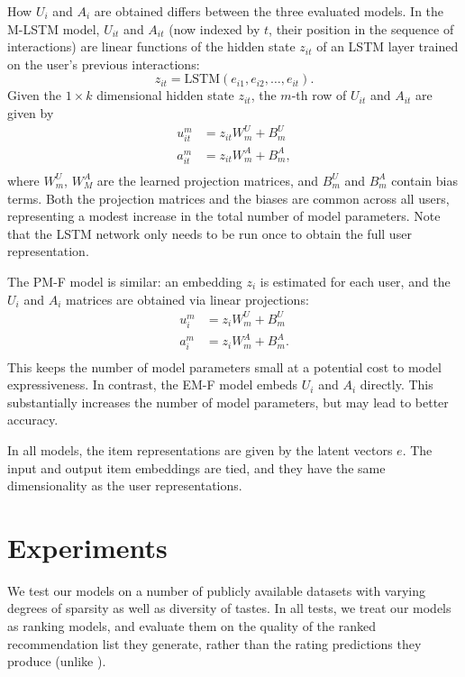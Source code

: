 \documentclass[sigconf]{acmart}
\begin{document}
How $U_i$ and $A_i$ are obtained differs between the three evaluated models. In the M-LSTM model, $U_{it}$ and $A_{it}$ (now indexed by $t$, their position in the sequence of interactions) are linear functions of the hidden state $z_{it}$ of an LSTM layer trained on the user's previous interactions:
\begin{equation}
  \label{eq:lstm}
  z_{it} = \mathrm{LSTM}\left(e_{i1}, e_{i2}, \ldots, e_{it}\right).
\end{equation}
Given the $1 \times k$ dimensional hidden state $z_{it}$, the $m$-th row of $U_{it}$ and $A_{it}$ are given by
\begin{equation}
\begin{aligned}
  u^m_{it} &= z_{it}W^U_m + B^U_m\\
  a^m_{it} &= z_{it}W^A_m + B^A_m,\\
\end{aligned}
\end{equation}
where $W^U_m$, $W^A_M$ are the learned projection matrices, and $B^U_m$ and $B^A_m$ contain bias terms. Both the projection matrices and the biases are common across all users, representing a modest increase in the total number of model parameters. Note that the LSTM network only needs to be run once to obtain the full user representation.

The PM-F model is similar: an embedding $z_i$ is estimated for each user, and the $U_i$ and $A_i$ matrices are obtained via linear projections:
\begin{equation}
\begin{aligned}
  u^m_{i} &= z_{i}W^U_m + B^U_m\\
  a^m_{i} &= z_{i}W^A_m + B^A_m.\\
\end{aligned}
\end{equation}
This keeps the number of model parameters small at a potential cost to model expressiveness. In contrast, the EM-F model embeds $U_i$ and $A_i$ directly. This substantially increases the number of model parameters, but may lead to better accuracy.

In all models, the item representations are given by the latent vectors $e$. The input and output item embeddings are tied, and they have the same dimensionality as the user representations.

\section{Experiments}
We test our models on a number of publicly available datasets with varying degrees of sparsity as well as diversity of tastes. In all tests, we treat our models as ranking models, and evaluate them on the quality of the ranked recommendation list they generate, rather than the rating predictions they produce (unlike \cite{wu2017recurrent}).
\end{document}
